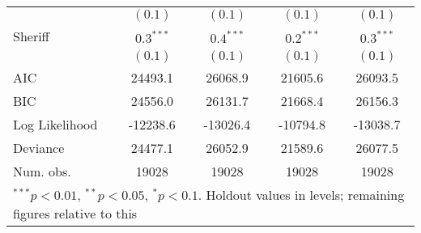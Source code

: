 \documentclass[12pt]{article}
\begin{document}
\begin{appendix}
\begin{table}[htb]
\begin{center}
\begin{tabular}{l c c c c }
               & $(0.1)$      & $(0.1)$     & $(0.1)$      & $(0.1)$      \\
Sheriff        & $0.3^{***}$  & $0.4^{***}$ & $0.2^{***}$  & $0.3^{***}$  \\
               & $(0.1)$      & $(0.1)$     & $(0.1)$      & $(0.1)$      \\
\hline
AIC            & 24493.1      & 26068.9     & 21605.6      & 26093.5      \\
BIC            & 24556.0      & 26131.7     & 21668.4      & 26156.3      \\
Log Likelihood & -12238.6     & -13026.4    & -10794.8     & -13038.7     \\
Deviance       & 24477.1      & 26052.9     & 21589.6      & 26077.5      \\
Num. obs.      & 19028        & 19028       & 19028        & 19028        \\
\hline
\multicolumn{5}{l}{\scriptsize{$^{***}p<0.01$, $^{**}p<0.05$,
    $^*p<0.1$. Holdout values in levels; remaining figures relative to
    this}}
\end{tabular}
\end{center}
\end{table}

\newpage


\end{appendix}
\end{document}
